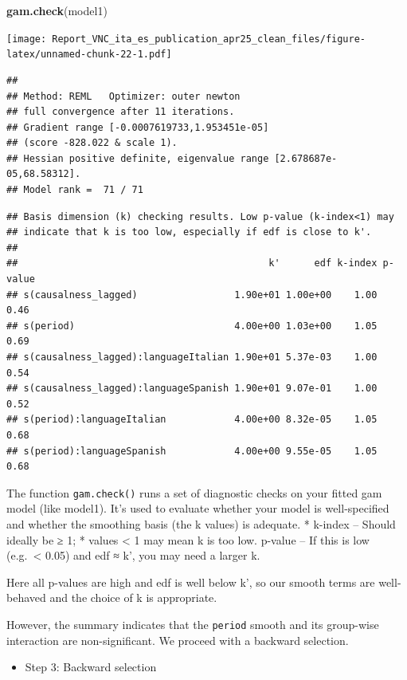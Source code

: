 \documentclass[
]{article}
\newenvironment{Shaded}{\begin{snugshade}}{\end{snugshade}}
\newcommand{\FunctionTok}[1]{\textcolor[rgb]{0.13,0.29,0.53}{\textbf{#1}}}
\newcommand{\NormalTok}[1]{#1}
\providecommand{\tightlist}{%
  \setlength{\itemsep}{0pt}\setlength{\parskip}{0pt}}
\begin{document}
\begin{Shaded}
\begin{Highlighting}[]
\FunctionTok{gam.check}\NormalTok{(model1)}
\end{Highlighting}
\end{Shaded}

\texttt{[image: Report\_VNC\_ita\_es\_publication\_apr25\_clean\_files/figure-latex/unnamed-chunk-22-1.pdf]}

\begin{verbatim}
## 
## Method: REML   Optimizer: outer newton
## full convergence after 11 iterations.
## Gradient range [-0.0007619733,1.953451e-05]
## (score -828.022 & scale 1).
## Hessian positive definite, eigenvalue range [2.678687e-05,68.58312].
## Model rank =  71 / 71
\end{verbatim}

\begin{verbatim}
## Basis dimension (k) checking results. Low p-value (k-index<1) may
## indicate that k is too low, especially if edf is close to k'.
## 
##                                            k'      edf k-index p-value
## s(causalness_lagged)                 1.90e+01 1.00e+00    1.00    0.46
## s(period)                            4.00e+00 1.03e+00    1.05    0.69
## s(causalness_lagged):languageItalian 1.90e+01 5.37e-03    1.00    0.54
## s(causalness_lagged):languageSpanish 1.90e+01 9.07e-01    1.00    0.52
## s(period):languageItalian            4.00e+00 8.32e-05    1.05    0.68
## s(period):languageSpanish            4.00e+00 9.55e-05    1.05    0.68
\end{verbatim}

The function \texttt{gam.check()} runs a set of diagnostic checks on
your fitted gam model (like model1). It's used to evaluate whether your
model is well-specified and whether the smoothing basis (the k values)
is adequate. * k-index -- Should ideally be ≥ 1; * values \textless{} 1
may mean k is too low. p-value -- If this is low (e.g.~\textless{} 0.05)
and edf ≈ k', you may need a larger k.

Here all p-values are high and edf is well below k', so our smooth terms
are well-behaved and the choice of k is appropriate.

However, the summary indicates that the \texttt{period} smooth and its
group-wise interaction are non-significant. We proceed with a backward
selection.

\begin{itemize}
\tightlist
\item
  Step 3: Backward selection
\end{itemize}
\end{document}
